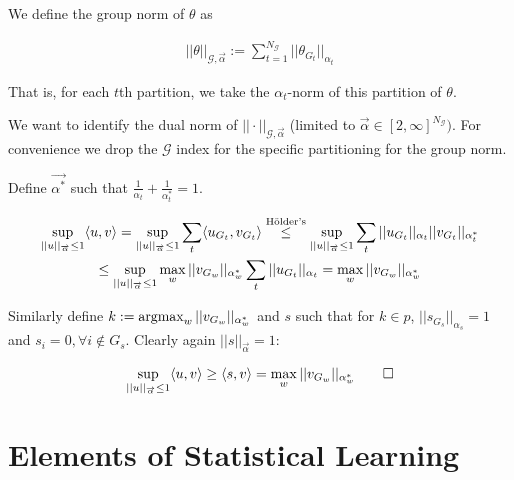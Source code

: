 \documentclass[11pt]{article}
\begin{document}
We define the group norm of $\theta$ as 

\begin{gather*}
    ||\theta||_{\mathcal{G}, \overrightarrow{\alpha}}
    := 
    \sum_{t=1}^{N_\mathcal{G}} ||\theta_{G_t}||_{\alpha_t}
\end{gather*}

That is, for each $t$th partition, we take the $\alpha_t$-norm of this partition of $\theta$. \newline 

We want to identify the dual norm of $||\cdot||_{\mathcal{G}, \overrightarrow\alpha}$ (limited to $\overrightarrow{\alpha} \in [2,\infty]^{N_\mathcal{G}})$. For convenience we drop the $\mathcal{G}$ index for the specific partitioning for the group norm. \newline 

Define $\overrightarrow{\alpha^*}$ such that $\frac{1}{\alpha_t} + \frac{1}{\alpha^*_t} = 1$. 

\begin{gather*}
    \sup_{||u||_{\overrightarrow\alpha} \leq 1} 
    \langle u,v\rangle
    =
    \sup_{||u||_{\overrightarrow\alpha} \leq 1} 
    \sum_t 
    \langle u_{G_t}, v_{G_t}\rangle
    \stackrel{\text{H\"{o}lder's}}{\leq}
    \sup_{||u||_{\overrightarrow\alpha} \leq 1} 
    \sum_t 
    ||u_{G_t}||_{\alpha_t}
    ||v_{G_t}||_{\alpha^*_t}
\\
    \leq 
    \sup_{||u||_{\overrightarrow\alpha} \leq 1} 
    \max_w ||v_{G_w}||_{\alpha^*_w}
    \sum_t 
    ||u_{G_t}||_{\alpha_t}
    =
    \max_w ||v_{G_w}||_{\alpha^*_w}
\end{gather*}

Similarly define $k := \operatorname{argmax}_w ||v_{G_w}||_{\alpha^*_w}
$ and $s$ such that for $k \in p$, $||s_{G_s}||_{\alpha_s}=1$ and $s_i=0, \forall i \not\in G_s$. Clearly again $||s||_{\overrightarrow{\alpha}} = 1$:

\begin{gather}
        \sup_{||u||_{\overrightarrow\alpha} \leq 1} 
        \langle u, v\rangle
        \geq 
        \langle s, v\rangle
        =
        \max_w ||v_{G_w}||_{\alpha^*_w} 
        \qed 
\end{gather}







\newpage
\begin{tcolorbox}
\vspace{4mm}
\bf \LARGE \chapter{Elements of Statistical Learning}
\vspace{4mm}
\end{tcolorbox}
\end{document}
